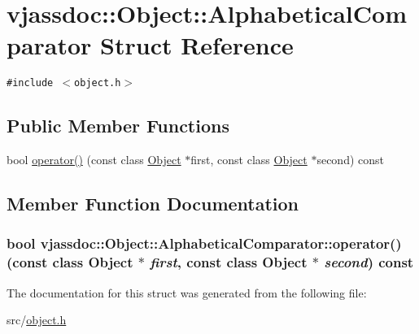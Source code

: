 \hypertarget{structvjassdoc_1_1Object_1_1AlphabeticalComparator}{
\section{vjassdoc::Object::AlphabeticalComparator Struct Reference}
\label{structvjassdoc_1_1Object_1_1AlphabeticalComparator}
}
{\tt \#include $<$object.h$>$}

\subsection*{Public Member Functions}
\begin{CompactItemize}
\item 
bool \hyperlink{structvjassdoc_1_1Object_1_1AlphabeticalComparator_7bb1d713406baf20c381d24a52ce6445}{operator()} (const class \hyperlink{classvjassdoc_1_1Object}{Object} $\ast$first, const class \hyperlink{classvjassdoc_1_1Object}{Object} $\ast$second) const 
\end{CompactItemize}


\subsection{Member Function Documentation}
\hypertarget{structvjassdoc_1_1Object_1_1AlphabeticalComparator_7bb1d713406baf20c381d24a52ce6445}{
\subsubsection{\setlength{\rightskip}{0pt plus 5cm}bool vjassdoc::Object::AlphabeticalComparator::operator() (const class {\bf Object} $\ast$ {\em first}, const class {\bf Object} $\ast$ {\em second}) const}}
\label{structvjassdoc_1_1Object_1_1AlphabeticalComparator_7bb1d713406baf20c381d24a52ce6445}




The documentation for this struct was generated from the following file:\begin{CompactItemize}
\item 
src/\hyperlink{object_8h}{object.h}\end{CompactItemize}
